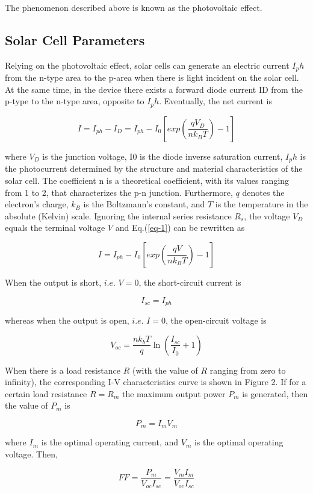 \documentclass{article}
\begin{document}
{The phenomenon described above is known as the photovoltaic effect.

\subsection{Solar Cell Parameters}

Relying on the photovoltaic effect, solar cells can generate an electric current $I_ph$ from
the n-type area to the p-area when there is light incident on the solar cell.
At the same time, in the device there exists a forward diode current ID from the p-type
to the n-type area, opposite to $I_ph$. Eventually, the net current is

\begin{equation}
I=I_{ph}-I_D=I_{ph}-I_0\left[exp\left(\frac{qV_D}{nk_BT}\right)-1\right]
\label{eq-1}
\end{equation}

where $V_D$ is the junction voltage, I0 is the diode inverse saturation current, $I_ph$ is the photocurrent determined by the structure and material characteristics of the solar cell. The coefficient n is a theoretical coefficient, with its values ranging from 1 to 2, that characterizes the p-n junction. Furthermore, $q$ denotes the electron's charge, $k_B$ is the Boltzmann's constant, and $T$ is the temperature in the absolute (Kelvin) scale. Ignoring the internal series resistance $R_s$, the voltage $V_D$ equals the terminal voltage $V$ and Eq.(\ref{eq-1}) can be rewritten as

$$I=I_{ph}-I_0\left[exp\left(\frac{qV}{nk_BT}\right)-1\right]$$

When the output is short, $i.e.$ $V = 0$, the short-circuit current is

$$I_{sc}=I_{ph}$$

whereas when the output is open, $i.e.$ $I = 0$, the open-circuit voltage is

$$V_{oc}=\frac{nk_bT}{q}\ln\left(\frac{I_{sc}}{I_0}+1\right)$$

When there is a load resistance $R$ (with the value of $R$ ranging from zero to infinity),
the corresponding I-V characteristics curve is shown in Figure 2. If for a certain load
resistance $R = R_m$ the maximum output power $P_m$ is generated, then the value of $P_m$ is

$$P_m=I_mV_m$$

where $I_m$ is the optimal operating current, and $V_m$ is the optimal operating voltage. Then,

$$FF=\frac{P_m}{V_{oc}I_{sc}}=\frac{V_mI_m}{V_{oc}I_{sc}}$$

}
\end{document}
